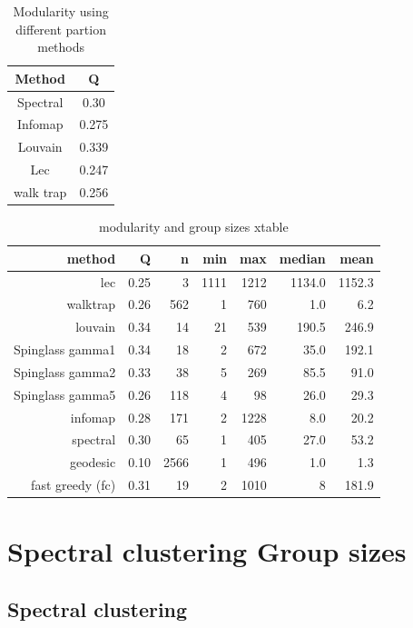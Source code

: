 \begin{table}[]
    \centering
    \begin{tabular}{cc}
    \toprule
        Method & Q \\
        \midrule
        Spectral & 0.30\\
        Infomap & 0.275\\
        Louvain & 0.339\\
        Lec & 0.247\\
        walk trap & 0.256\\
        \bottomrule
    \end{tabular}
    \caption{Modularity using different partion methods}
    \label{tab:modularity}
\end{table}
\begin{table}[ht]
\centering

\begin{tabular}{rrrrrrr}
  \toprule
method & Q & n & min & max & median & mean \\ 
  \midrule
lec & 0.25 & 3 & 1111 & 1212 & 1134.0 & 1152.3 \\ 
  walktrap & 0.26 & 562 & 1 & 760 & 1.0 & 6.2 \\ 
  louvain & 0.34 & 14 & 21 & 539 & 190.5 & 246.9 \\ 
  Spinglass gamma1 & 0.34 & 18 & 2 & 672 & 35.0 & 192.1 \\ 
  Spinglass gamma2 & 0.33 & 38 & 5 & 269 & 85.5 & 91.0 \\ 
  Spinglass gamma5 & 0.26 & 118 & 4 & 98 & 26.0 & 29.3 \\ 
  infomap & 0.28 & 171 & 2 & 1228 & 8.0 & 20.2 \\ 
  spectral & 0.30 & 65 & 1 & 405 & 27.0 & 53.2 \\ 
  geodesic & 0.10 & 2566 & 1 & 496 & 1.0 & 1.3 \\ 
  fast greedy (fc) & 0.31 & 19 & 2 & 1010 & 8 & 181.9 \\
   \bottomrule
\end{tabular}
\caption{modularity and group sizes xtable} 
\label{tab:modularity and group sizes xtable}
\end{table}

\section{Spectral clustering Group sizes}
\subsection{Spectral clustering}

